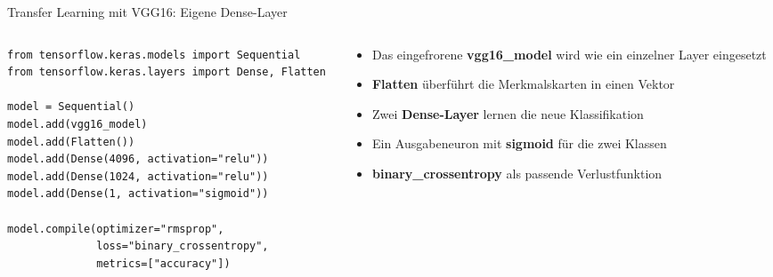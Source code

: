 \begin{frame}[fragile]{Transfer Learning mit VGG16: Eigene Dense-Layer}
\begin{columns}
\begin{column}{0.6\textwidth}
\begin{verbatim}
from tensorflow.keras.models import Sequential
from tensorflow.keras.layers import Dense, Flatten

model = Sequential()
model.add(vgg16_model)
model.add(Flatten())
model.add(Dense(4096, activation="relu"))
model.add(Dense(1024, activation="relu"))
model.add(Dense(1, activation="sigmoid"))

model.compile(optimizer="rmsprop",
              loss="binary_crossentropy",
              metrics=["accuracy"])
\end{verbatim}
\end{column}
\begin{column}{0.35\textwidth}
\footnotesize
\begin{itemize}
  \item Das eingefrorene \textbf{vgg16\_model} wird wie ein einzelner Layer eingesetzt
  \item \textbf{Flatten} überführt die Merkmalskarten in einen Vektor
  \item Zwei \textbf{Dense-Layer} lernen die neue Klassifikation
  \item Ein Ausgabeneuron mit \textbf{sigmoid} für die zwei Klassen
  \item \textbf{binary\_crossentropy} als passende Verlustfunktion
\end{itemize}
\end{column}
\end{columns}
\end{frame}

